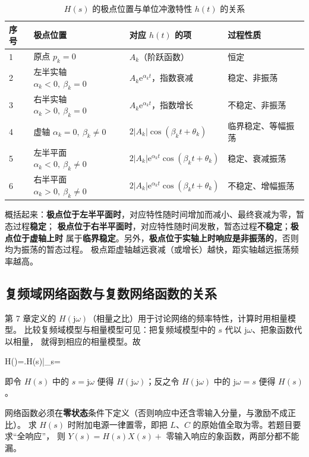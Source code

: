 \begin{table}[htbp]
  \centering
  \renewcommand{\tablename}{表}%
  \caption{$H(s)$ 的极点位置与单位冲激特性 $h(t)$ 的关系}
  \begin{tabular}{llll}
    \toprule
    序号 & 极点位置 & 对应 $h(t)$ 的项 & 过程性质 \\
    \midrule
    1 & 原点 $p_k=0$ & $A_k$（阶跃函数） & 恒定 \\
    2 & 左半实轴 $\alpha_k<0,\ \beta_k=0$ & $A_k\mathrm{e}^{\alpha_kt}$，指数衰减 & 稳定、非振荡 \\
    3 & 右半实轴 $\alpha_k>0,\ \beta_k=0$ & $A_k\mathrm{e}^{\alpha_kt}$，指数增长 & 不稳定、非振荡 \\
    4 & 虚轴 $\alpha_k=0,\ \beta_k\ne0$ & $2|A_k|\cos(\beta_kt+\theta_k)$ & 临界稳定、等幅振荡 \\
    5 & 左半平面 $\alpha_k<0,\ \beta_k\ne0$ & $2|A_k|\mathrm{e}^{\alpha_kt}\cos(\beta_kt+\theta_k)$ & 稳定、衰减振荡 \\
    6 & 右半平面 $\alpha_k>0,\ \beta_k\ne0$ & $2|A_k|\mathrm{e}^{\alpha_kt}\cos(\beta_kt+\theta_k)$ & 不稳定、增幅振荡 \\
    \bottomrule
  \end{tabular}
\end{table}

概括起来：\textbf{极点位于左半平面时}，对应特性随时间增加而减小、最终衰减为零，暂态过程\textbf{稳定}；
\textbf{极点位于右半平面时}，对应特性随时间发散，暂态过程\textbf{不稳定}；\textbf{极点位于虚轴上时}
属于\textbf{临界稳定}。另外，\textbf{极点位于实轴上时响应是非振荡的}，否则均为振荡的暂态过程。
极点距虚轴越远衰减（或增长）越快，距实轴越远振荡频率越高。

\subsection{复频域网络函数与复数网络函数的关系}
第 7 章定义的 $H(\mathrm{j}\omega)$（相量之比）用于讨论网络的频率特性，计算时用相量模型。
比较复频域模型与相量模型可见：把复频域模型中的 $s$ 代以 $\mathrm{j}\omega$、把象函数代以相量，
就得到相应的相量模型。故
\begin{keyformula}{H(\omega)=\left.H(s)\right|_{s=\omega}}
\end{keyformula}
即令 $H(s)$ 中的 $s=\mathrm{j}\omega$ 便得 $H(\mathrm{j}\omega)$；反之令 $H(\mathrm{j}\omega)$ 中的
$\mathrm{j}\omega=s$ 便得 $H(s)$。

\begin{corepoint}{网络函数必须在\textbf{零状态}条件下定义（否则响应中还含零输入分量，与激励不成正比）。
求 $H(s)$ 时附加电源一律置零，即把 $L$、$C$ 的原始值全取为零。若题目要求“全响应”，
则 $Y(s)=H(s)X(s)+$ 零输入响应的象函数，两部分都不能漏。}
\end{corepoint}

